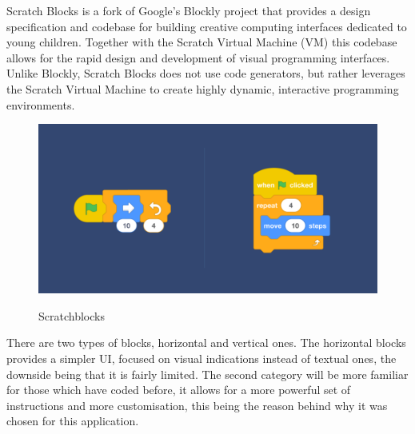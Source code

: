 \documentclass[12 pct]{report}
\begin{document}
Scratch Blocks is a fork of Google's Blockly project that provides a design specification and codebase for building creative computing interfaces dedicated to young children. Together with the Scratch Virtual Machine (VM) this codebase allows for the rapid design and development of visual programming interfaces. Unlike Blockly, Scratch Blocks does not use code generators, but rather leverages the Scratch Virtual Machine to create highly dynamic, interactive programming environments.

\begin{figure}[H]
\includegraphics[width=1.0\textwidth]{scratchblocks}
\centering
\label{fig:hololens}
\caption{Scratchblocks}
\end{figure}

There are two types of blocks, horizontal and vertical ones. The horizontal blocks provides a simpler UI, focused on visual indications instead of textual ones, the downside being that it is fairly limited. The second category will be more familiar for those which have coded before, it allows for a more powerful set of instructions and more customisation, this being the reason behind why it was chosen for this application.
\end{document}
